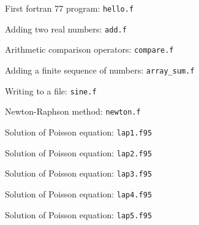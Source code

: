 \documentclass[11pt,oneside]{amsart}
\begin{document}
\newpage

\begin{figure}

\caption{First fortran 77 program: {\tt hello.f}}
\label{hello}
\end{figure}

\begin{figure}

\caption{Adding two real numbers: {\tt add.f}}
\label{add}
\end{figure}

\begin{figure}

\caption{Arithmetic comparison operators: {\tt compare.f}}
\label{compare}
\end{figure}

\begin{figure}

\caption{Adding a finite sequence of numbers: {\tt array\_sum.f}}
\label{arraysum}
\end{figure}

\begin{figure}

\caption{Writing to a file: {\tt sine.f}}
\label{sine}
\end{figure}

\begin{figure}

\caption{Newton-Raphson method: {\tt newton.f}}
\label{newton}
\end{figure}

\begin{figure}

\caption{Solution of Poisson equation: {\tt lap1.f95}}
\label{lap1}
\end{figure}

\begin{figure}

\caption{Solution of Poisson equation: {\tt lap2.f95}}
\label{lap2}
\end{figure}

\begin{figure}

\caption{Solution of Poisson equation: {\tt lap3.f95}}
\label{lap3}
\end{figure}

\begin{figure}

\caption{Solution of Poisson equation: {\tt lap4.f95}}
\label{lap4}
\end{figure}

\begin{figure}

\caption{Solution of Poisson equation: {\tt lap5.f95}}
\label{lap5}
\end{figure}
\end{document}

